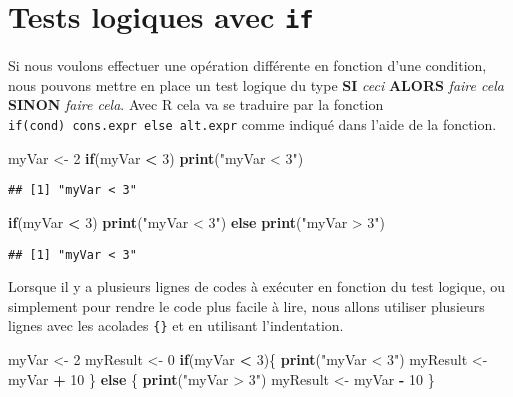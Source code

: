 \documentclass[]{book}
\newenvironment{Shaded}{\begin{snugshade}}{\end{snugshade}}
\newcommand{\KeywordTok}[1]{\textcolor[rgb]{0.13,0.29,0.53}{\textbf{#1}}}
\newcommand{\DecValTok}[1]{\textcolor[rgb]{0.00,0.00,0.81}{#1}}
\newcommand{\StringTok}[1]{\textcolor[rgb]{0.31,0.60,0.02}{#1}}
\newcommand{\ControlFlowTok}[1]{\textcolor[rgb]{0.13,0.29,0.53}{\textbf{#1}}}
\newcommand{\OperatorTok}[1]{\textcolor[rgb]{0.81,0.36,0.00}{\textbf{#1}}}
\newcommand{\NormalTok}[1]{#1}
\theoremstyle{definition}
\theoremstyle{definition}
\theoremstyle{definition}
\theoremstyle{remark}
\begin{document}
\hypertarget{l17if}{\section{\texorpdfstring{Tests logiques avec
\texttt{if}}{Tests logiques avec if}}\label{l17if}}

Si nous voulons effectuer une opération différente en fonction d'une
condition, nous pouvons mettre en place un test logique du type
\textbf{SI} \emph{ceci} \textbf{ALORS} \emph{faire cela} \textbf{SINON}
\emph{faire cela}. Avec R cela va se traduire par la fonction
\texttt{if(cond)\ cons.expr\ else\ alt.expr} comme indiqué dans l'aide
de la fonction.

\begin{Shaded}
\begin{Highlighting}[]
\NormalTok{myVar <-}\StringTok{ }\DecValTok{2}
\ControlFlowTok{if}\NormalTok{(myVar }\OperatorTok{<}\StringTok{ }\DecValTok{3}\NormalTok{) }\KeywordTok{print}\NormalTok{(}\StringTok{"myVar < 3"}\NormalTok{)}
\end{Highlighting}
\end{Shaded}

\begin{verbatim}
## [1] "myVar < 3"
\end{verbatim}

\begin{Shaded}
\begin{Highlighting}[]
\ControlFlowTok{if}\NormalTok{(myVar }\OperatorTok{<}\StringTok{ }\DecValTok{3}\NormalTok{) }\KeywordTok{print}\NormalTok{(}\StringTok{"myVar < 3"}\NormalTok{) }\ControlFlowTok{else} \KeywordTok{print}\NormalTok{(}\StringTok{"myVar > 3"}\NormalTok{)}
\end{Highlighting}
\end{Shaded}

\begin{verbatim}
## [1] "myVar < 3"
\end{verbatim}

Lorsque il y a plusieurs lignes de codes à exécuter en fonction du test
logique, ou simplement pour rendre le code plus facile à lire, nous
allons utiliser plusieurs lignes avec les acolades \texttt{\{\}} et en
utilisant l'indentation.

\begin{Shaded}
\begin{Highlighting}[]
\NormalTok{myVar <-}\StringTok{ }\DecValTok{2}
\NormalTok{myResult <-}\StringTok{ }\DecValTok{0}
\ControlFlowTok{if}\NormalTok{(myVar }\OperatorTok{<}\StringTok{ }\DecValTok{3}\NormalTok{)\{}
  \KeywordTok{print}\NormalTok{(}\StringTok{"myVar < 3"}\NormalTok{)}
\NormalTok{  myResult <-}\StringTok{ }\NormalTok{myVar }\OperatorTok{+}\StringTok{ }\DecValTok{10}
\NormalTok{\} }\ControlFlowTok{else}\NormalTok{ \{}
  \KeywordTok{print}\NormalTok{(}\StringTok{"myVar > 3"}\NormalTok{)}
\NormalTok{  myResult <-}\StringTok{ }\NormalTok{myVar }\OperatorTok{-}\StringTok{ }\DecValTok{10}
\NormalTok{\}}
\end{Highlighting}
\end{Shaded}
\end{document}

